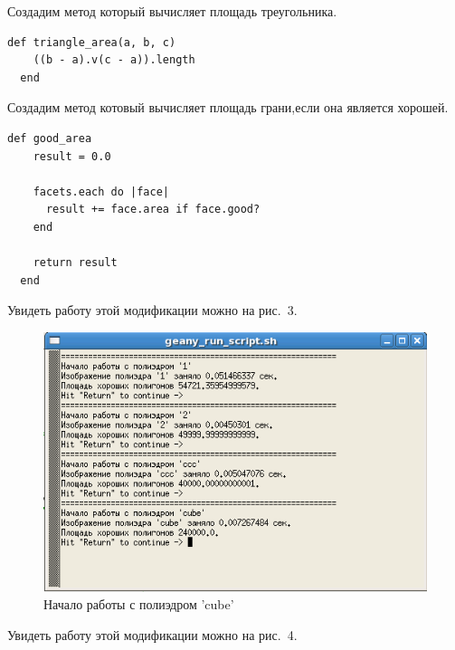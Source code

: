Создадим метод который вычисляет площадь треугольника.

\begin{small}
\begin{verbatim}
def triangle_area(a, b, c)
    ((b - a).v(c - a)).length
  end
\end{verbatim}
\end{small}

Создадим метод котовый вычисляет площадь грани,если она является хорошей.

\begin{small}
\begin{verbatim}
def good_area
    result = 0.0

    facets.each do |face|
      result += face.area if face.good?
    end

    return result
  end
\end{verbatim}
\end{small}



\newpage
Увидеть работу этой модификации можно на рис.~3.

\begin{figure}[ht!]
\begin{center}
\includegraphics[scale=0.6]{images/5}
\end{center}
\vspace*{-8mm}
\caption{Начало работы с полиэдром 'cube'}\label{fig:term_2}
\end{figure}

Увидеть работу этой модификации можно на рис.~4.


